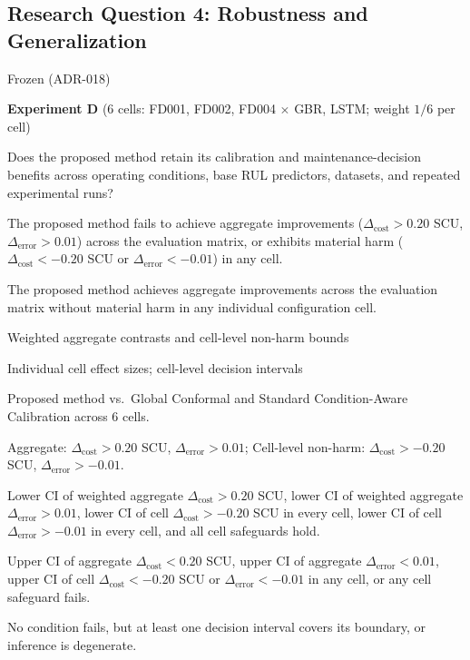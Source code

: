 \documentclass{article}
\begin{document}
\subsection*{Research Question 4: Robustness and Generalization}
\begin{description}[style=multiline,leftmargin=3.5cm]
  \item[Status:] Frozen (ADR-018)
  \item[Experiment:] \textbf{Experiment D} (6 cells: FD001, FD002, FD004 $\times$ GBR, LSTM; weight $1/6$ per cell)
  \item[Question:] Does the proposed method retain its calibration and maintenance-decision benefits across operating conditions, base RUL predictors, datasets, and repeated experimental runs?
  \item[Null ($H_{0,4}$):] The proposed method fails to achieve aggregate improvements ($\Delta_{\text{cost}} > 0.20$ SCU, $\Delta_{\text{error}} > 0.01$) across the evaluation matrix, or exhibits material harm ($\Delta_{\text{cost}} < -0.20$ SCU or $\Delta_{\text{error}} < -0.01$) in any cell.
  \item[Alt ($H_{1,4}$):] The proposed method achieves aggregate improvements across the evaluation matrix without material harm in any individual configuration cell.
  \item[Primary Outcome:] Weighted aggregate contrasts and cell-level non-harm bounds
  \item[Supporting Outcomes:] Individual cell effect sizes; cell-level decision intervals
  \item[Comparison:] Proposed method vs.\ Global Conformal and Standard Condition-Aware Calibration across 6 cells.
  \item[Threshold:] Aggregate: $\Delta_{\text{cost}} > 0.20$ SCU, $\Delta_{\text{error}} > 0.01$; Cell-level non-harm: $\Delta_{\text{cost}} > -0.20$ SCU, $\Delta_{\text{error}} > -0.01$.
  \item[Supported Logic:] Lower CI of weighted aggregate $\Delta_{\text{cost}} > 0.20$ SCU, lower CI of weighted aggregate $\Delta_{\text{error}} > 0.01$, lower CI of cell $\Delta_{\text{cost}} > -0.20$ SCU in every cell, lower CI of cell $\Delta_{\text{error}} > -0.01$ in every cell, and all cell safeguards hold.
  \item[Unsupported Logic:] Upper CI of aggregate $\Delta_{\text{cost}} < 0.20$ SCU, upper CI of aggregate $\Delta_{\text{error}} < 0.01$, upper CI of cell $\Delta_{\text{cost}} < -0.20$ SCU or $\Delta_{\text{error}} < -0.01$ in any cell, or any cell safeguard fails.
  \item[Inconclusive Logic:] No condition fails, but at least one decision interval covers its boundary, or inference is degenerate.
\end{description}
\end{document}
